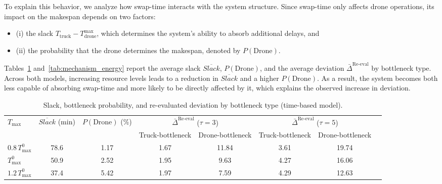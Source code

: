 \documentclass[3p, authoryear, 11pt]{elsarticle}
\begin{document}
To explain this behavior, we analyze how swap-time interacts with the system structure. Since swap-time only affects drone operations, its impact on the makespan depends on two factors: 
\begin{itemize}
    \item (i) the slack $T_{\text{truck}} - T_{\text{drone}}^{\max}$, which determines the system’s ability to absorb additional delays, and
    \item (ii) the probability that the drone determines the makespan, denoted by $P(\text{Drone})$.
\end{itemize}
 
Tables~\ref{tab:mechanism_time} and~\ref{tab:mechanism_energy} report the average slack $\overline{Slack}$, $P(\text{Drone})$, and the average deviation $\bar{\Delta}^{\mathrm{Re\text{-}eval}}$ by bottleneck type.
Across both models, increasing resource levels leads to a reduction in $\overline{Slack}$ and a higher $P(\text{Drone})$. 
As a result, the system becomes both less capable of absorbing swap-time and more likely to be directly affected by it, which explains the observed increase in deviation.

\begin{table}[H]
\centering
\caption{Slack, bottleneck probability, and re-evaluated deviation by bottleneck type (time-based model).}
\label{tab:mechanism_time}
\scriptsize
\begin{tabular}{lccccccc}
\toprule
$T_{\max}$ 
& $\overline{Slack}$ (min) 
& $P(\text{Drone})$ (\%) 
& \multicolumn{2}{c}{$\bar{\Delta}^{\mathrm{Re\text{-}eval}}$ ($\tau=3$)} 
& \multicolumn{2}{c}{$\bar{\Delta}^{\mathrm{Re\text{-}eval}}$ ($\tau=5$)} \\
\cmidrule(lr){4-5} \cmidrule(lr){6-7}
 &  &  & Truck-bottleneck & Drone-bottleneck 
 & Truck-bottleneck & Drone-bottleneck \\
\midrule
$0.8\,T_{\max}^{0}$ & 78.6 & 1.17 & 1.67 & 11.84 & 3.61 & 19.74 \\
$T_{\max}^{0}$      & 50.9 & 2.52 & 1.95 & 9.63  & 4.27 & 16.06 \\
$1.2\,T_{\max}^{0}$ & 37.4 & 5.42 & 1.97 & 7.59  & 4.29 & 12.63 \\
\bottomrule
\end{tabular}
\end{table}
\end{document}
